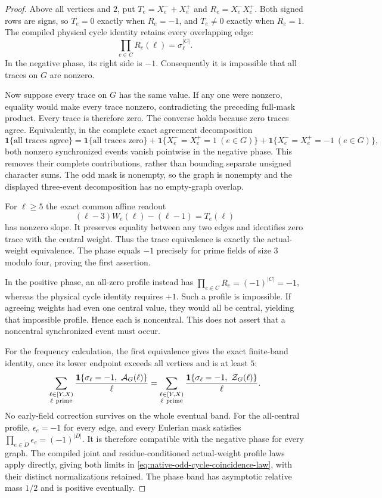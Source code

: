\documentclass[11pt]{article}
\begin{document}
\begin{proof}
Above all vertices and \(2\), put \(T_e=X^-_e+X^+_e\) and
\(R_e=X^-_eX^+_e\). Both signed rows are signs, so
\(T_e=0\) exactly when \(R_e=-1\), and \(T_e\ne0\) exactly when
\(R_e=1\).
The compiled physical cycle identity retains every overlapping edge:
\[
                 \prod_{e\in C}R_e(\ell)=\sigma_\ell^{|C|}.
\]
In the negative phase, its right side is \(-1\).
Consequently it is impossible that all traces on \(G\) are nonzero.

Now suppose every trace on \(G\) has the same value.
If any one were nonzero, equality would make every trace nonzero,
contradicting the preceding full-mask product.
Every trace is therefore zero.
The converse holds because zero traces agree.
Equivalently, in the complete exact agreement decomposition
\[
 \mathbf1\{\text{all traces agree}\}
 =
 \mathbf1\{\text{all traces zero}\}
 +\mathbf1\{X^-_e=X^+_e=1\ (e\in G)\}
 +\mathbf1\{X^-_e=X^+_e=-1\ (e\in G)\},
\]
both nonzero synchronized events vanish pointwise in the negative
phase. This removes their complete contributions, rather than
bounding separate unsigned character sums.
The odd mask is nonempty, so the graph is nonempty and the displayed
three-event decomposition has no empty-graph overlap.

For \(\ell\geq5\) the exact common affine readout
\[
       (\ell-3)W_e(\ell)-(\ell-1)=T_e(\ell)
\]
has nonzero slope. It preserves equality between any two edges and
identifies zero trace with the central weight.
Thus the trace equivalence is exactly the actual-weight equivalence.
The phase equals \(-1\) precisely for prime fields of size \(3\)
modulo four, proving the first assertion.

In the positive phase, an all-zero profile instead has
\(\prod_{e\in C}R_e=(-1)^{|C|}=-1\), whereas the physical cycle
identity requires \(+1\). Such a profile is impossible.
If agreeing weights had even one central value, they would all be
central, yielding that impossible profile. Hence each is noncentral.
This does not assert that a noncentral synchronized event must occur.

For the frequency calculation, the first equivalence gives the exact
finite-band identity, once its lower endpoint exceeds all vertices
and is at least \(5\):
\[
 \sum_{\substack{\ell\in[Y,X)\\\ell\ {\rm prime}}}
       \frac{\mathbf1\{\sigma_\ell=-1,\ \mathcal A_G(\ell)\}}{\ell}
 =
 \sum_{\substack{\ell\in[Y,X)\\\ell\ {\rm prime}}}
       \frac{\mathbf1\{\sigma_\ell=-1,\ \mathcal Z_G(\ell)\}}{\ell}.
\]
No early-field correction survives on the whole eventual band.
For the all-central profile, \(\epsilon_e=-1\) for every edge,
and every Eulerian mask satisfies
\(\prod_{e\in D}\epsilon_e=(-1)^{|D|}\).
It is therefore compatible with the negative phase for every graph.
The compiled joint and residue-conditioned actual-weight profile laws
apply directly, giving both limits in
\eqref{eq:native-odd-cycle-coincidence-law}, with their distinct
normalizations retained.
The phase band has asymptotic relative mass \(1/2\) and is positive
eventually.


\end{proof}
\end{document}
